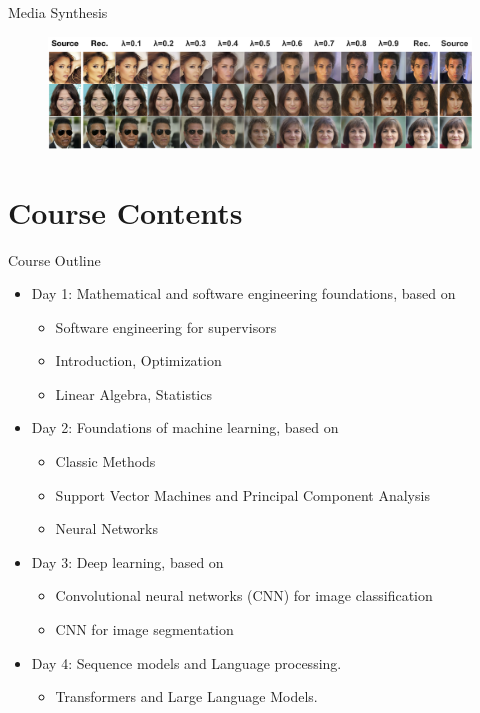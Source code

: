 \documentclass{beamer}
\begin{document}
    \begin{frame}{Media Synthesis \cite{ho2020denoising}}
      \begin{figure}
        \includegraphics[width=\linewidth]{./figures/interp.jpg}
      \end{figure}
    \end{frame}


    \section{Course Contents}



    \begin{frame}{Course Outline}
      \begin{itemize}
        \item Day 1: Mathematical and software engineering foundations, based on \cite{deisenroth_faisal_ong_2020}
         \begin{itemize}
            \item  Software engineering for supervisors
            \item  Introduction, Optimization
            \item  Linear Algebra, Statistics
         \end{itemize}
        \item Day 2: Foundations of machine learning, based on \cite{deisenroth_faisal_ong_2020}
        \begin{itemize}
          \item Classic Methods
          \item Support Vector Machines and Principal Component Analysis
          \item Neural Networks
        \end{itemize}
        \item Day 3: Deep learning, based on \cite{Goodfellow_et_al_2016}
        \begin{itemize}
          \item Convolutional neural networks (CNN) for image classification
          \item CNN for image segmentation
        \end{itemize}
        \item Day 4: Sequence models and Language processing.
        \begin{itemize}
          \item Transformers and Large Language Models.
        \end{itemize}
      \end{itemize}
    \end{frame}
\end{document}
